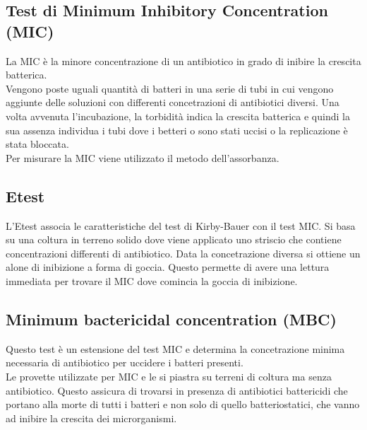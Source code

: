 \subsection{Test di Minimum Inhibitory Concentration (MIC)}
La MIC è la minore concentrazione di un antibiotico in grado di inibire la crescita batterica. 
\\Vengono poste uguali quantità di batteri in una serie di tubi in cui vengono aggiunte delle soluzioni con differenti concetrazioni di antibiotici diversi. Una volta avvenuta l'incubazione, la torbidità indica la crescita batterica e quindi la sua assenza individua i tubi dove i betteri o sono stati uccisi o la replicazione è stata bloccata. 
\\Per misurare la MIC viene utilizzato il metodo dell'assorbanza. 
\subsection{Etest}
L'Etest associa le caratteristiche del test di Kirby-Bauer con il test MIC. Si basa su una coltura in terreno solido dove viene applicato uno striscio che contiene concentrazioni differenti di antibiotico. Data la concetrazione diversa si ottiene un alone di inibizione a forma di goccia. Questo permette di avere una lettura immediata per trovare il MIC dove comincia la goccia di inibizione.
\subsection{Minimum bactericidal concentration (MBC)}
Questo test è un estensione del test MIC e determina la concetrazione minima necessaria di antibiotico per uccidere i batteri presenti. 
\\Le provette utilizzate per MIC e le si piastra su terreni di coltura ma senza antibiotico. Questo assicura di trovarsi in presenza di antibiotici battericidi che portano alla morte di tutti i batteri e non solo di quello batteriostatici, che vanno ad inibire la crescita dei microrganismi. 
